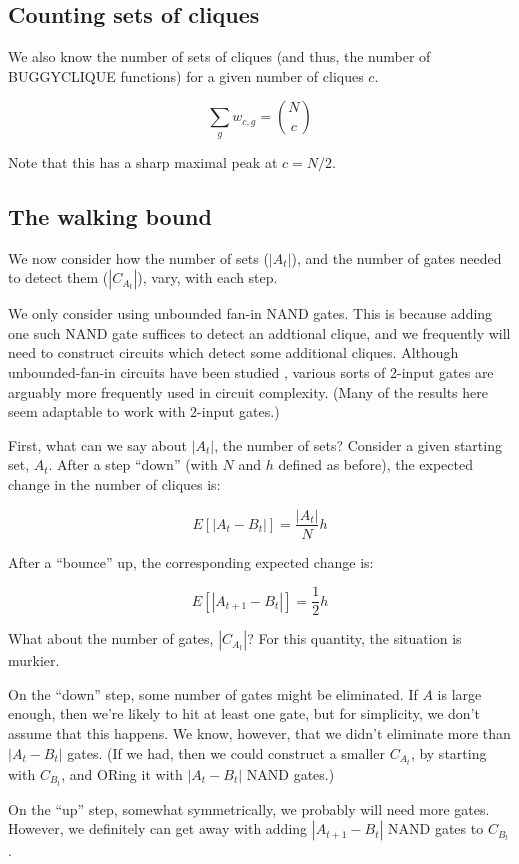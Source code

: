 \documentclass[12pt]{article}
\theoremstyle{definition}
\begin{document}
\subsection{Counting sets of cliques}

We also know the number of sets of cliques (and thus, the number
of BUGGYCLIQUE functions) for a given number of cliques $c$.

\[
\sum_g w_{c,g} = {N \choose c}
\]

Note that this has a sharp maximal peak at $c = N/2$.

\subsection{The walking bound}

We now consider how the number of sets ($|A_t|$), and
the number of gates needed to detect them ($|C_{A_t}|$),
vary, with each step.

We only consider using unbounded fan-in NAND gates.
This is because adding one such NAND gate suffices to detect an
addtional clique, and we frequently will need to construct circuits which detect
some additional cliques.
Although unbounded-fan-in circuits have been studied
\cite{wegener1991complexity}\cite{allender1994depth}, various sorts of 2-input gates are arguably
more frequently used in circuit complexity. (Many of the results here
seem adaptable to work with 2-input gates.)

First, what can we say about $|A_t|$, the number of sets?
Consider a given starting set, $A_t$.
After a step ``down'' (with $N$ and $h$ defined as before),
the expected change in the number of cliques is:

\[
E[|A_t - B_t|] = \frac{|A_t|}{N}h
\]

After a ``bounce'' up, the corresponding expected change is:

\[
E[|A_{t+1} - B_t|] = \frac{1}{2}h
\]

What about the number of gates, $|C_{A_t}|$? For this quantity,
the situation is murkier.

On the ``down'' step, some number of gates might be eliminated.
If $A$ is large enough, then we're likely to hit at least one gate,
but for simplicity, we don't assume that this happens.
We know, however, that we didn't eliminate more than $|A_t - B_t|$
gates. (If we had, then we could construct a smaller $C_{A_t}$,
by starting with $C_{B_t}$, and ORing it with $|A_t - B_t|$
NAND gates.)

On the ``up'' step, somewhat symmetrically, we probably will
need more gates. However, we definitely can get away with
adding $|A_{t+1} - B_t|$ NAND gates to $C_{B_t}$.
\end{document}
